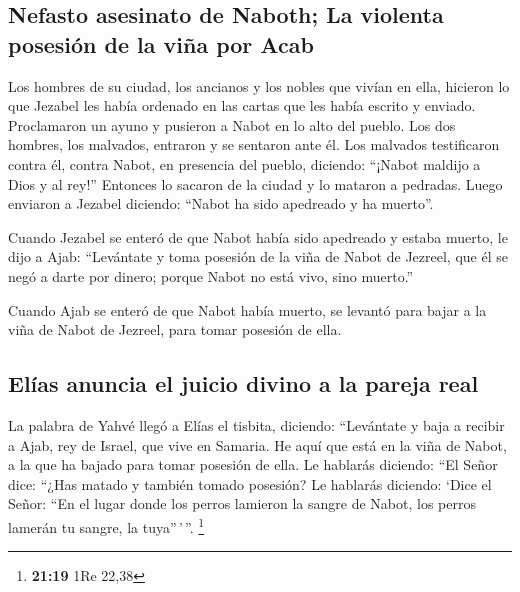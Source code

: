 \hypertarget{nefasto-asesinato-de-naboth-la-violenta-posesiuxf3n-de-la-viuxf1a-por-acab}{%
\subsection{Nefasto asesinato de Naboth; La violenta posesión de la viña
por
Acab}\label{nefasto-asesinato-de-naboth-la-violenta-posesiuxf3n-de-la-viuxf1a-por-acab}}

 Los hombres de su ciudad, los ancianos y los nobles que
vivían en ella, hicieron lo que Jezabel les había ordenado en las cartas
que les había escrito y enviado.  Proclamaron un ayuno y
pusieron a Nabot en lo alto del pueblo.  Los dos hombres,
los malvados, entraron y se sentaron ante él. Los malvados testificaron
contra él, contra Nabot, en presencia del pueblo, diciendo: ``¡Nabot
maldijo a Dios y al rey!'' Entonces lo sacaron de la ciudad y lo mataron
a pedradas.  Luego enviaron a Jezabel diciendo: ``Nabot
ha sido apedreado y ha muerto''.

 Cuando Jezabel se enteró de que Nabot había sido
apedreado y estaba muerto, le dijo a Ajab: ``Levántate y toma posesión
de la viña de Nabot de Jezreel, que él se negó a darte por dinero;
porque Nabot no está vivo, sino muerto.''

 Cuando Ajab se enteró de que Nabot había muerto, se
levantó para bajar a la viña de Nabot de Jezreel, para tomar posesión de
ella.

\hypertarget{eluxedas-anuncia-el-juicio-divino-a-la-pareja-real}{%
\subsection{Elías anuncia el juicio divino a la pareja
real}\label{eluxedas-anuncia-el-juicio-divino-a-la-pareja-real}}

 La palabra de Yahvé llegó a Elías el tisbita, diciendo:
 ``Levántate y baja a recibir a Ajab, rey de Israel, que
vive en Samaria. He aquí que está en la viña de Nabot, a la que ha
bajado para tomar posesión de ella.  Le hablarás
diciendo: ``El Señor dice: ``¿Has matado y también tomado posesión? Le
hablarás diciendo: `Dice el Señor: ``En el lugar donde los perros
lamieron la sangre de Nabot, los perros lamerán tu sangre, la
tuya''\,'\,''. \footnote{\textbf{21:19} 1Re 22,38}

